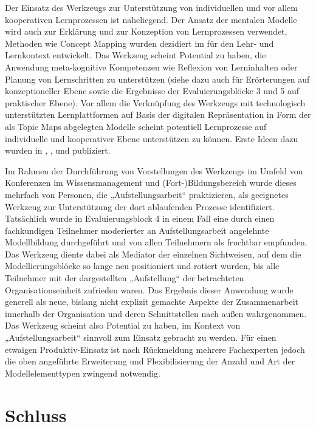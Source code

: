 Der Einsatz des Werkzeugs zur Unterstützung von individuellen und vor allem kooperativen Lernprozessen ist naheliegend. Der Ansatz der mentalen Modelle wird auch zur Erklärung und zur Konzeption von Lernprozessen verwendet, Methoden wie Concept Mapping wurden dezidiert im für den Lehr- und Lernkontext entwickelt. Das Werkzeug scheint Potential zu haben, die Anwendung meta-kognitive Kompetenzen wie Reflexion von Lerninhalten oder Planung von Lernschritten zu unterstützen (siehe dazu auch \citep{Oppl10a} für Erörterungen auf konzeptioneller Ebene sowie die Ergebnisse der Evaluierungsblöcke 3 und 5 auf praktischer Ebene). Vor allem die Verknüpfung des Werkzeugs mit technologisch unterstützten Lernplattformen auf Basis der digitalen Repräsentation in Form der als Topic Maps abgelegten Modelle scheint potentiell Lernprozesse auf individuelle und kooperativer Ebene unterstützen zu können. Erste Ideen dazu wurden in \cite{Oppl09}, \citet{Oppl09c}, \citet{Oppl09d} und \cite{Neubauer09a} publiziert.

Im Rahmen der Durchführung von Vorstellungen des Werkzeugs im Umfeld von Konferenzen im Wissensmanagement und (Fort-)Bildungsbereich wurde dieses mehrfach von Personen, die „Aufstellungsarbeit“ \cite{Sparrer02} praktizieren, als geeignetes Werkzeug zur Unterstützung der dort ablaufenden Prozesse identifiziert. Tatsächlich wurde in Evaluierungsblock 4 in einem Fall eine durch einen fachkundigen Teilnehmer moderierter an Aufstellungsarbeit angelehnte Modellbildung durchgeführt und von allen Teilnehmern als fruchtbar empfunden. Das Werkzeug diente dabei als Mediator der einzelnen Sichtweisen, auf dem die Modellierungsblöcke so lange neu positioniert und rotiert wurden, bis alle Teilnehmer mit der dargestellten „Aufstellung“ der betrachteten Organisationseinheit zufrieden waren. Das Ergebnis dieser Anwendung wurde generell als neue, bislang nicht explizit gemachte Aspekte der Zusammenarbeit innerhalb der Organisation und deren Schnittstellen nach außen wahrgenommen. Das Werkzeug scheint also Potential zu haben, im Kontext von „Aufstellungsarbeit“ sinnvoll zum Einsatz gebracht zu werden. Für einen etwaigen Produktiv-Einsatz ist nach Rückmeldung mehrere Fachexperten jedoch die oben angeführte Erweiterung und Flexibilisierung der Anzahl und Art der Modellelementtypen zwingend notwendig.


\section{Schluss}
\label{sec:schluss}

